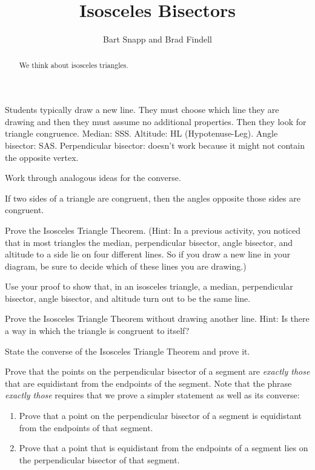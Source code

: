 \documentclass[nooutcomes]{ximera}
\title{Isosceles Bisectors}
\author{Bart Snapp and Brad Findell}
\begin{document}
\begin{abstract}
  We think about isosceles triangles.
\end{abstract}
\maketitle

\begin{teachingnote}
Students typically draw a new line. They must choose which line they are drawing and then they must assume no additional properties.  Then they look for triangle congruence.  Median: SSS.  Altitude: HL (Hypotenuse-Leg).  Angle bisector: SAS. Perpendicular bisector: doesn't work because it might not contain the opposite vertex.  

Work through analogous ideas for the converse. 
\end{teachingnote}

\begin{theorem}
If two sides of a triangle are congruent, then the angles opposite those sides are congruent. 
\end{theorem}

\begin{problem}
Prove the Isosceles Triangle Theorem.  (Hint: In a previous activity, you noticed that in most triangles the median, perpendicular bisector, angle bisector, and altitude to a side lie on four different lines.  So if you draw a new line in your diagram, be sure to decide which of these lines you are drawing.)
\vfill
\end{problem}

\begin{problem}
Use your proof to show that, in an isosceles triangle, a median, perpendicular bisector, angle bisector, and altitude turn out to be the same line.
\vfill
\end{problem}

\newpage
\begin{problem}
Prove the Isosceles Triangle Theorem without drawing another line.  Hint:  Is there a way in which the triangle is congruent to itself? 
\vfill
\end{problem}

\begin{problem}
State the converse of the Isosceles Triangle Theorem and prove it.  
\vfill
\end{problem}

\newpage
\begin{problem}
Prove that the points on the perpendicular bisector of a segment are \emph{exactly those} that are equidistant from the endpoints of the segment.  Note that the phrase \emph{exactly those} requires that we prove a simpler statement as well as its converse:   
\begin{enumerate}
\item Prove that a point on the perpendicular bisector of a segment is equidistant from the endpoints of that segment.
\item Prove that a point that is equidistant from the endpoints of a segment lies on the perpendicular bisector of that segment.
\end{enumerate}
\vfill
\end{problem}
\end{document}
